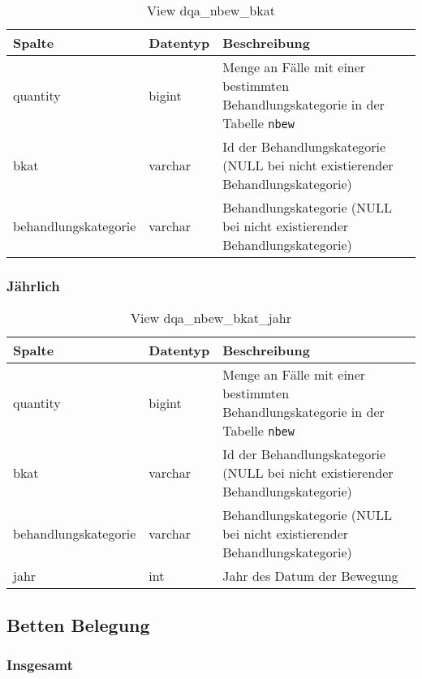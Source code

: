 \begin{table}[ht]
	\centering   
	\caption{View dqa\_nbew\_bkat}
	\label{tab:beweBkatAll}
	\begin{tabular}{||l|l|p{10cm}||}   		
		\hline
		Spalte & Datentyp & Beschreibung \\ [0.5ex]
		\hline\hline
		quantity & bigint & Menge an Fälle mit einer bestimmten Behandlungskategorie in der Tabelle \texttt{nbew} \\
		\hline
		bkat & varchar & Id der Behandlungskategorie (NULL bei nicht existierender Behandlungskategorie)\\
		\hline
		behandlungskategorie & varchar & Behandlungskategorie (NULL bei nicht existierender Behandlungskategorie)\\
		\hline
		
	\end{tabular}
\end{table}

\subsubsection{Jährlich} \label{subsubsec:behKatJ}

\begin{table}[ht]
	\centering   
	\caption{View dqa\_nbew\_bkat\_jahr}
	\label{tab:beweBkatJahr}
	\begin{tabular}{||l|l|p{10cm}||}   		
		\hline
		Spalte & Datentyp & Beschreibung \\ [0.5ex]
		\hline\hline
		quantity & bigint & Menge an Fälle mit einer bestimmten Behandlungskategorie in der Tabelle \texttt{nbew} \\
		\hline
		bkat & varchar & Id der Behandlungskategorie (NULL bei nicht existierender Behandlungskategorie)\\
		\hline
		behandlungskategorie & varchar & Behandlungskategorie (NULL bei nicht existierender Behandlungskategorie)\\
		\hline
		jahr & int &  Jahr des Datum der Bewegung \\
		\hline
		
	\end{tabular}
\end{table}


\subsection{Betten Belegung} \label{subsec:bett}

\subsubsection{Insgesamt} \label{subsubsec:bettI}

